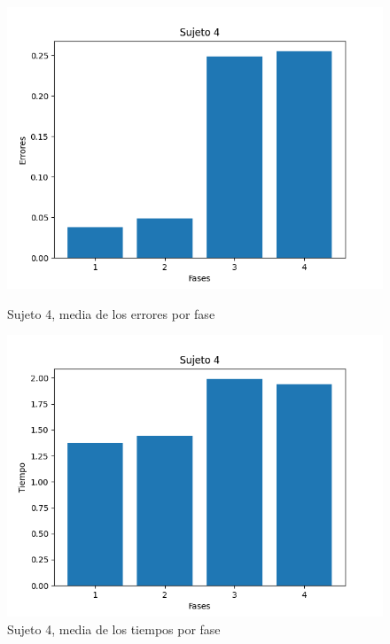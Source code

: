 \documentclass[a4paper,11pt, oneside]{book}
\begin{document}
\begin{figure}[H]
	\begin{minipage}[b]{0.5\linewidth}
		\centering
		\includegraphics[width=\linewidth]{sujeto4-errores}
		\caption{Sujeto 4, media de los errores por fase}
		\label{sujeto4-errores}
	\end{minipage}
	\hspace{0.5cm}
	\begin{minipage}[b]{0.5\linewidth}
		\centering
		\includegraphics[width=\linewidth]{sujeto4-time}
		\caption{Sujeto 4, media de los tiempos por fase}
		\label{sujeto4-time}
	\end{minipage}
\end{figure}
\end{document}
